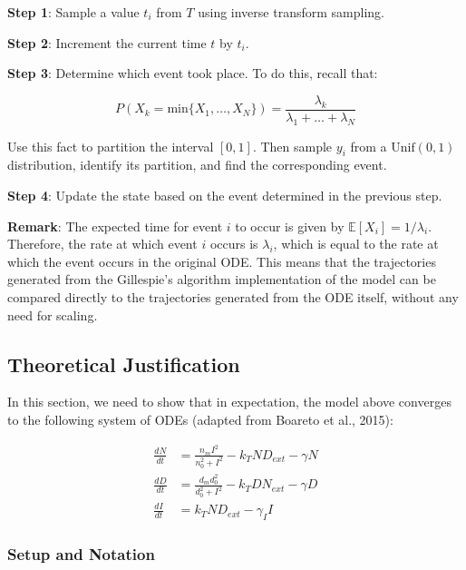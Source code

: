 \documentclass{article}
\begin{document}
\begin{flushleft}
\textbf{Step 1}: Sample a value $t_{i}$ from $T$ using inverse transform sampling. 

\medskip

\textbf{Step 2}: Increment the current time $t$ by $t_{i}$.

\medskip

\textbf{Step 3}: Determine which event took place. To do this, recall that:

$$P(X_{k} = \text{min} \{  X_{1}, \dots, X_{N} \}) = \frac{\lambda_{k}}{\lambda_{1} + \dots + \lambda_{N}}$$

Use this fact to partition the interval $[0, 1]$. Then sample $y_{i}$ from a $\text{Unif}(0, 1)$ distribution, identify its partition, and find the corresponding event.

\medskip

\textbf{Step 4}: Update the state based on the event determined in the previous step.

\medskip

\textbf{Remark}: The expected time for event $i$ to occur is given by $\mathbb{E}[X_{i}] = 1/\lambda_{i}$. Therefore, the rate at which event $i$ occurs is $\lambda_{i}$, which is equal to the rate at which the event occurs in the original ODE. This means that the trajectories generated from the Gillespie's algorithm implementation of the model can be compared directly to the trajectories generated from the ODE itself, without any need for scaling.

\subsection{Theoretical Justification}

In this section, we need to show that in expectation, the model above converges to the following system of ODEs (adapted from Boareto et al., 2015):

$$
\begin{aligned}
  \frac{dN}{dt} &= \frac{n_{m}I^2}{n_{0}^2 + I^2} - k_{T}ND_{ext} - \gamma N \\[5pt]
  \frac{dD}{dt} &= \frac{d_{m}d_{0}^2}{d_{0}^2 + I^2} - k_{T}DN_{ext} - \gamma D \\[5pt]
  \frac{dI}{dt} &= k_{T}ND_{ext} - \gamma_{I}I
\end{aligned}
$$

\subsubsection{Setup and Notation}


\end{flushleft}
\end{document}
